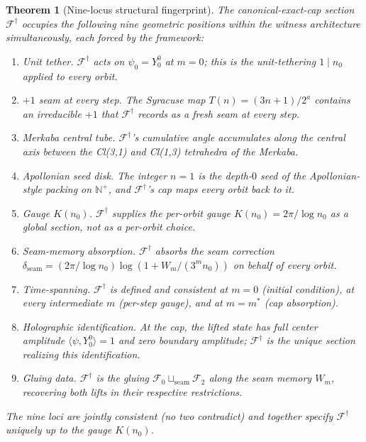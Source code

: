 \documentclass[11pt,a4paper]{article}
\theoremstyle{plain}
\newtheorem{theorem}{Theorem}[section]
\theoremstyle{definition}
\theoremstyle{remark}
\numberwithin{equation}{section}
\newcommand{\Nat}{\mathbb{N}}
\begin{document}
\begin{theorem}[Nine-locus structural fingerprint]
\label{thm:nine-loci-fingerprint}
The canonical-exact-cap section $\mathcal{F}^{\dagger}$ occupies the
following nine geometric positions within the witness architecture
simultaneously, each forced by the framework:
\begin{enumerate}
  \item \emph{Unit tether.}  $\mathcal{F}^{\dagger}$ acts on $\psi_0=
        Y_0^0$ at $m=0$; this is the unit-tethering $1\mid n_0$
        applied to every orbit.
  \item \emph{$+1$ seam at every step.}  The Syracuse map $T(n)=
        (3n+1)/2^a$ contains an irreducible $+1$ that
        $\mathcal{F}^{\dagger}$ records as a fresh seam at every
        step.
  \item \emph{Merkaba central tube.}  $\mathcal{F}^{\dagger}$'s
        cumulative angle accumulates along the central axis between
        the Cl(3,1) and Cl(1,3) tetrahedra of the Merkaba.
  \item \emph{Apollonian seed disk.}  The integer $n=1$ is the
        depth-$0$ seed of the Apollonian-style packing on $\Nat^+$,
        and $\mathcal{F}^{\dagger}$'s cap maps every orbit back to
        it.
  \item \emph{Gauge $K(n_0)$.}  $\mathcal{F}^{\dagger}$ supplies the
        per-orbit gauge $K(n_0)=2\pi/\log n_0$ as a global section,
        not as a per-orbit choice.
  \item \emph{Seam-memory absorption.}  $\mathcal{F}^{\dagger}$
        absorbs the seam correction
        $\delta_{\mathrm{seam}}=(2\pi/\log n_0)\log(1+W_m/(3^m n_0))$
        on behalf of every orbit.
  \item \emph{Time-spanning.}  $\mathcal{F}^{\dagger}$ is defined
        and consistent at $m=0$ (initial condition), at every
        intermediate $m$ (per-step gauge), and at $m=m^{*}$ (cap
        absorption).
  \item \emph{Holographic identification.}  At the cap, the lifted
        state has full center amplitude
        $\langle\psi,Y_0^0\rangle=1$ and zero boundary amplitude;
        $\mathcal{F}^{\dagger}$ is the unique section realizing this
        identification.
  \item \emph{Gluing data.}  $\mathcal{F}^{\dagger}$ is the gluing
        $\mathcal{F}_0\sqcup_{\mathrm{seam}}\mathcal{F}_2$ along
        the seam memory $W_m$, recovering both lifts in their
        respective restrictions.
\end{enumerate}
The nine loci are jointly consistent (no two contradict) and
together specify $\mathcal{F}^{\dagger}$ uniquely up to the gauge
$K(n_0)$.
\end{theorem}
\end{document}
